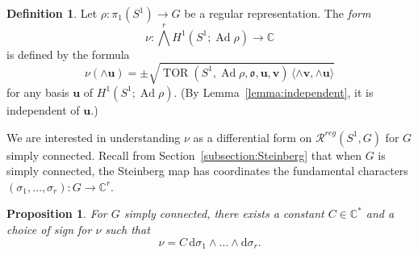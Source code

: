 \documentclass[11pt]{article}
\newtheorem{Proposition}[theo]{Proposition}
\theoremstyle{definition}
\newtheorem{defi}[theo]{Definition}
\numberwithin{equation}{section}
\numberwithin{figure}{section}
\numberwithin{table}{section}
\DeclareMathOperator{\TOR}{TOR}
\DeclareMathOperator{\Ad}{Ad}
\newcommand{\Rcal}{\mathcal{R}}
\newcommand{\Cbb}{\mathbb{C}}
\newcommand{\ofrk}{\mathfrak{o}}
\newcommand{\ubf}{\mathbf{u}}
\newcommand{\vbf}{\mathbf{v}}
\newcommand*{\dd}{\mathrm{d}}
\begin{document}
\goodbreak
\begin{defi}\label{Def:peripheralform}
Let $\rho\colon\pi_1 (S^1)\to G$ be a regular representation. The \emph{form}
\[
\nu\colon \bigwedge^r H^1(S^1;\Ad\rho)\to \Cbb
\]
is defined by the formula
\begin{equation}\label{eqn:peripheral}
\nu (\wedge\ubf)=\pm \sqrt{ \TOR(S^1,\Ad\rho, \ofrk, \ubf,\vbf)
\, \langle \wedge\vbf, \wedge\ubf \rangle }
\end{equation}
for any basis $\ubf$ of $H^1(S^1;\Ad\rho)$. (By Lemma~\ref{lemma:independent}, it is independent of $\ubf$.)
\end{defi}


We are interested in understanding $\nu$ as a differential form on $\Rcal^{reg}(S^1, G)$ for $G$ simply connected. Recall from Section~\ref{subsection:Steinberg} that when $G$ is simply connected, the Steinberg map has coordinates the fundamental characters $(\sigma_1,\dots,\sigma_r)\colon G\to\Cbb^r$.

\begin{Proposition}\label{prop:nudsigma}
For $G$ simply connected, there exists a constant $C\in\Cbb^*$ and a choice of sign for $\nu$ such that
\[
\nu= C\, \dd\sigma_1\wedge\dots\wedge \dd\sigma_{r}.
\]
\end{Proposition}
\end{document}
